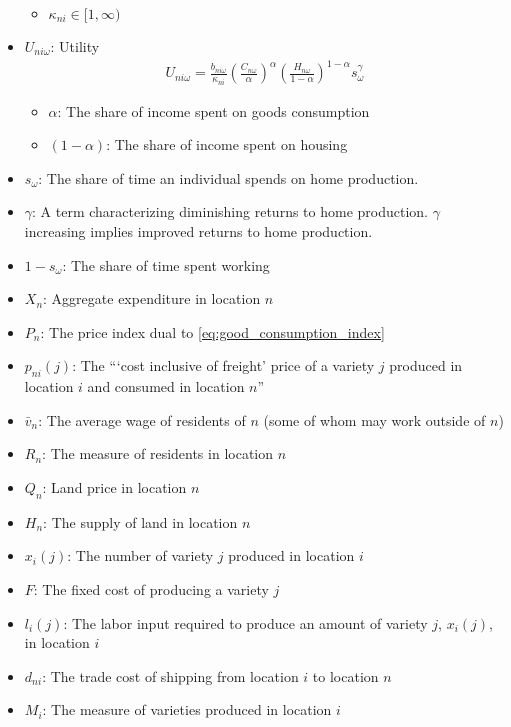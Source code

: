 \begin{itemize}
\begin{itemize}
            \item $\kappa_{n i} \in[1, \infty)$
        \end{itemize}
    \item $U_{n i \omega}$: Utility
        \begin{align}
            U_{n i \omega}=\frac{b_{n i \omega}}{\kappa_{n i}}\left(\frac{C_{n \omega}}{\alpha}\right)^\alpha\left(\frac{H_{n \omega}}{1-\alpha}\right)^{1-\alpha} s_\omega^\gamma
        \end{align}
        \begin{itemize}
            \item $\alpha$: The share of income spent on goods consumption
            \item $(1-\alpha)$: The share of income spent on housing
        \end{itemize}
    \item $s_\omega$: The share of time an individual spends 
        on home production. 
    \item $\gamma$: A term characterizing diminishing returns to home 
        production. $\gamma$ increasing implies improved returns 
        to home production.
    \item $1 - s_\omega$: The share of time spent working
    \item $X_n$: Aggregate expenditure in location $n$
    \item $P_n$: The price index dual to \eqref{eq:good_consumption_index}
    \item $p_{n i}(j)$: The  ```cost inclusive of freight' price of a variety $j$ produced in location $i$ and consumed in location $n$''
    \item $\bar{v}_n$: The average wage of residents of $n$ (some of whom may work outside of $n$)
    \item $R_n$: The measure of residents in location $n$
    \item $Q_n$: Land price in location $n$
    \item $H_n$: The supply of land in location $n$
    \item $x_i(j)$: The number of variety $j$ produced in location $i$
    \item $F$: The fixed cost of producing a variety $j$
    \item $l_i(j)$: The labor input required to produce an amount of variety $j$, $x_i(j)$, in location $i$
    \item $d_{ni}$: The trade cost of shipping from location $i$ to location $n$
    \item $M_i$: The measure of varieties produced in location $i$

\end{itemize}
